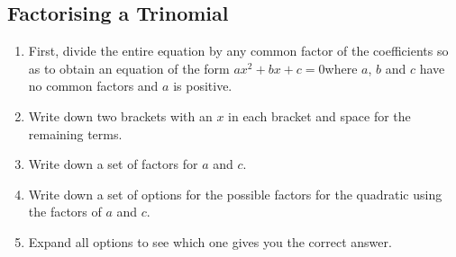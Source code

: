             \subsection{Factorising a Trinomial}
            \nopagebreak
        \label{m39394*id276561}\begin{enumerate}[noitemsep, label=\textbf{\arabic*}. ] 
            \label{m39394*uid21}\item First, divide the entire equation by any common factor of the coefficients so as to obtain an equation of the form $a{x}^{2}+bx+c=0$\hspace{1ex}where $a$, $b$ and $c$ have no common factors and $a$ is positive.
\label{m39394*uid22}\item Write down two brackets with an $x$ in each bracket and space for the remaining terms.
\label{m39394*uid23}\nopagebreak\noindent{}
    \label{m39394*uid24}\item Write down a set of factors for $a$ and $c$.
\label{m39394*uid25}\item Write down a set of options for the possible factors for the quadratic using the factors of $a$ and $c$.
\label{m39394*uid26}\item Expand all options to see which one gives you the correct answer.
\end{enumerate}
